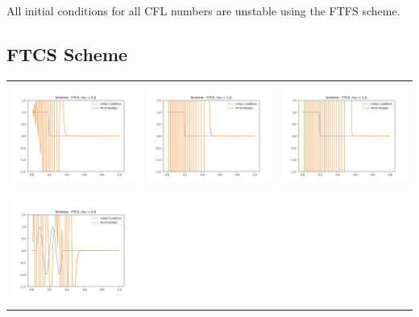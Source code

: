 \documentclass[a4paper,twoside,11pt]{article}
\begin{document}
All initial conditions for all CFL numbers are unstable using the FTFS scheme.


\newpage
  \subsection*{FTCS Scheme}
  \begin{table}[!h]
      \centering
      \begin{tabular}{ | c | m{5cm} | m{5cm} | }
        \hline
        \begin{minipage}{.3\textwidth}
          \includegraphics[width=\linewidth, height=3.5cm]{../plots/scheme2-IC1-mu0_5.png}
        \end{minipage}
        &
        \begin{minipage}{.3\textwidth}
          \includegraphics[width=\linewidth, height=3.5cm]{../plots/scheme2-IC1-mu1_0.png}
        \end{minipage}
        &
        \begin{minipage}{.3\textwidth}
          \includegraphics[width=\linewidth, height=3.5cm]{../plots/scheme2-IC1-mu1_5.png}
        \end{minipage} \\
        \begin{minipage}{.3\textwidth}
          \includegraphics[width=\linewidth, height=3.5cm]{../plots/scheme2-IC2-mu0_5.png}

\end{minipage}
\end{tabular}
\end{table}
\end{document}
